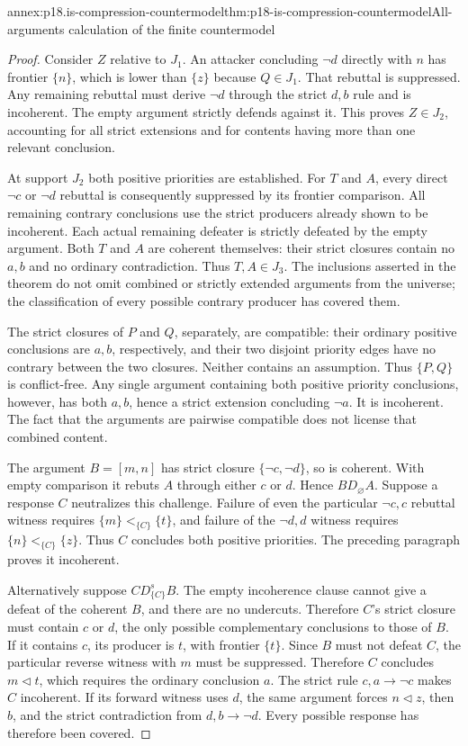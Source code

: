 \begin{annexitem}{annex:p18.is-compression-countermodel}{thm:p18-is-compression-countermodel}{All-arguments calculation of the finite countermodel}
\begin{proof}
Consider \(Z\) relative to \(J_1\).
An attacker concluding \(\neg d\) directly with \(n\) has frontier
\(\{n\}\), which is lower than \(\{z\}\) because \(Q\in J_1\).
That rebuttal is suppressed. Any remaining rebuttal must derive
\(\neg d\) through the strict \(d,b\) rule and is incoherent.
The empty argument strictly defends against it.
This proves \(Z\in J_2\), accounting for all strict extensions
and for contents having more than one relevant conclusion.

At support \(J_2\) both positive priorities are established.
For \(T\) and \(A\), every direct \(\neg c\) or \(\neg d\)
rebuttal is consequently suppressed by its frontier comparison.
All remaining contrary conclusions use the strict producers
already shown to be incoherent. Each actual remaining defeater
is strictly defeated by the empty argument.
Both \(T\) and \(A\) are coherent themselves: their strict closures
contain no \(a,b\) and no ordinary contradiction.
Thus \(T,A\in J_3\). The inclusions asserted in the theorem
do not omit combined or strictly extended arguments from the
universe; the classification of every possible contrary producer
has covered them.

The strict closures of \(P\) and \(Q\), separately, are compatible:
their ordinary positive conclusions are \(a,b\), respectively,
and their two disjoint priority edges have no contrary between
the two closures. Neither contains an assumption. Thus
\(\{P,Q\}\) is conflict-free.
Any single argument containing both positive priority conclusions,
however, has both \(a,b\), hence a strict extension concluding
\(\neg a\). It is incoherent. The fact that the arguments are
pairwise compatible does not license that combined content.

The argument \(B=[m,n]\) has strict closure
\(\{\neg c,\neg d\}\), so is coherent.
With empty comparison it rebuts \(A\) through either \(c\) or \(d\).
Hence \(B D_\varnothing A\).
Suppose a response \(C\) neutralizes this challenge.
Failure of even the particular \(\neg c,c\) rebuttal witness
requires
\(\{m\}<_{\{C\}}\{t\}\), and failure of the \(\neg d,d\)
witness requires
\(\{n\}<_{\{C\}}\{z\}\).
Thus \(C\) concludes both positive priorities. The preceding
paragraph proves it incoherent.

Alternatively suppose \(C D_{\{C\}}^s B\).
The empty incoherence clause cannot give a defeat of the coherent
\(B\), and there are no undercuts.
Therefore \(C\)'s strict closure must contain \(c\) or \(d\),
the only possible complementary conclusions to those of \(B\).
If it contains \(c\), its producer is \(t\), with frontier
\(\{t\}\). Since \(B\) must not defeat \(C\), the particular
reverse witness with \(m\) must be suppressed.
Therefore \(C\) concludes \(m\triangleleft t\), which requires
the ordinary conclusion \(a\).
The strict rule \(c,a\to\neg c\) makes \(C\) incoherent.
If its forward witness uses \(d\), the same argument forces
\(n\triangleleft z\), then \(b\), and the strict contradiction
from \(d,b\to\neg d\).
Every possible response has therefore been covered.


\end{proof}
\end{annexitem}
